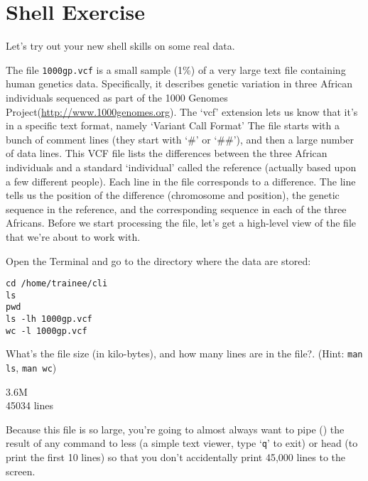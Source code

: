 \newpage
\section{Shell Exercise}

\begin{information}
Let's try out your new shell skills on some real data.

The file \texttt{1000gp.vcf} is a small sample (1\%) of a very large text file containing human genetics data. Specifically, it describes genetic variation in three African individuals sequenced as part of the 1000 Genomes Project(\url{http://www.1000genomes.org}).
The `vcf' extension lets us know that it's in a specific text format, namely `Variant Call Format' The file starts with a bunch of comment lines (they start with `\#' or `\#\#'), and then a large number of data lines. This VCF file lists the differences between the three African individuals and a standard `individual' called the reference (actually based upon a few different people). Each line in the file corresponds to a difference. The line tells us the position of the difference (chromosome and position), the genetic sequence in the reference, and the corresponding sequence in each of the three Africans.
Before we start processing the file, let's get a high-level view of the file that we're about to work with.

\end{information}

\begin{steps}
Open the Terminal and go to the directory where the data are stored:
\begin{lstlisting}
cd /home/trainee/cli
ls
pwd
ls -lh 1000gp.vcf
wc -l 1000gp.vcf
\end{lstlisting}
\end{steps}

\begin{questions}
What's the file size (in kilo-bytes), and how many lines are in the file?. (Hint: \texttt{man ls}, \texttt{man wc}) \\
\begin{answer}
3.6M \\
45034 lines \\
\end{answer}
\end{questions}


\begin{note}
Because this file is so large, you're going to almost always want to pipe (\texttt{\textbar}) the result of any command to less (a simple text viewer, type `\texttt{q}' to exit) or head (to print the first 10 lines) so that you don't accidentally print 45,000 lines to the screen.
\end{note}

